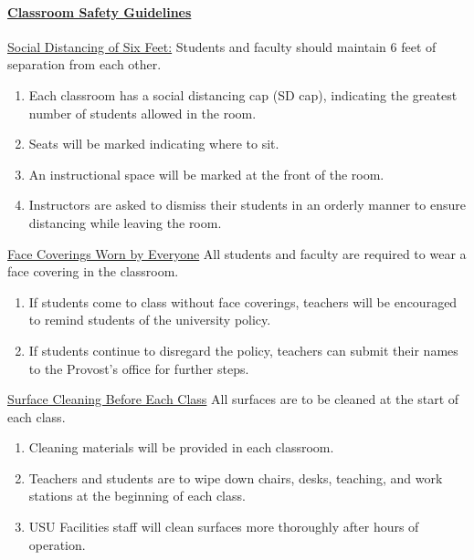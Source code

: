 \documentclass[10pt,fleqn]{article}
\begin{document}
\paragraph{\underline{Classroom Safety Guidelines}}

\noindent
  \underline{Social Distancing of Six Feet:} Students and faculty should
            maintain 6 feet of separation from each other.
    \begin{enumerate}
      \item Each classroom has a social distancing cap (SD cap), indicating the
            greatest number of students allowed in the room.
      \item Seats will be marked indicating where to sit.
      \item An instructional space will be marked at the front of the room.

      \item Instructors are asked to dismiss their students in an orderly manner
            to ensure distancing while leaving the room.
    \end{enumerate}

\noindent
  \underline{Face Coverings Worn by Everyone} All students and faculty are
            required to wear a face covering in the classroom.

    \begin{enumerate}
      \item If students come to class without face coverings, teachers will be
            encouraged to remind students of the university policy.
      \item If students continue to disregard the policy, teachers can submit
            their names to the Provost's office for further steps.
    \end{enumerate}

\noindent
  \underline{Surface Cleaning Before Each Class} All surfaces are to be cleaned
            at the start of each class.
      \begin{enumerate}
        \item Cleaning materials will be provided in each classroom.
        \item Teachers and students are to wipe down chairs, desks, teaching,
              and work stations at the beginning of each class.
        \item USU Facilities staff will clean surfaces more thoroughly after
              hours of operation. 
      \end{enumerate}
\end{document}

